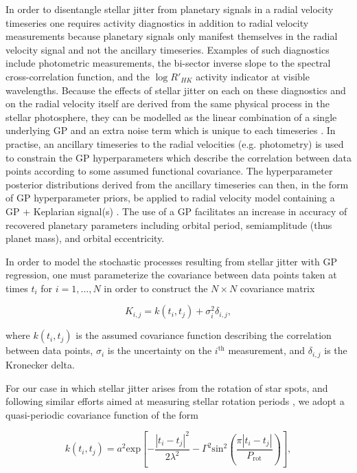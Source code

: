 In order to disentangle stellar jitter from planetary signals in a radial 
velocity timeseries one requires activity diagnostics in addition to radial 
velocity measurements because planetary signals only manifest themselves in 
the radial velocity signal and not the ancillary timeseries. 
Examples of such diagnostics include photometric measurements, 
the bi-sector inverse slope to the spectral cross-correlation function, and 
the $\log{R'_{HK}}$ activity indicator at visible wavelengths. Because the 
effects of stellar jitter on each on these diagnostics and on the radial 
velocity itself 
are derived from the same physical process in the stellar photosphere, they 
can be modelled as the linear combination of a single underlying GP and an extra
noise term which is unique to each timeseries \citep{rajpaul15}. In practise, 
an ancillary timeseries to the radial velocities (e.g. photometry) is used to 
constrain the GP hyperparameters 
which describe the correlation between data points according to some assumed 
functional covariance. The hyperparameter 
posterior distributions derived from the ancillary timeseries can then, in 
the form of GP hyperparameter priors, be 
applied to radial velocity model containing a GP + Keplarian signal(s) 
\citep{hayword14, grunblatt15}. The 
use of a GP facilitates an increase in accuracy of recovered 
planetary parameters including orbital period, semiamplitude (thus planet 
mass), and orbital eccentricity. 

In order to model the stochastic processes resulting from stellar jitter with 
GP regression, one must parameterize the covariance between data points taken 
at times $t_i$ for $i= 1, \dots, N$ in order to construct the $N \times N$ 
covariance matrix 

\begin{equation}
K_{i,j} = k(t_i, t_j) + \sigma_i^2 \delta_{i,j},
\end{equation}

\noindent where $k(t_i,t_j)$ is the assumed covariance function describing 
the correlation between data points, $\sigma_i$ is the uncertainty on the 
$i^{\mathrm{th}}$ measurement, and $\delta_{i,j}$ is the Kronecker delta. 

For our case in which stellar jitter arises from the rotation of star spots, 
and following similar efforts aimed at measuring stellar rotation periods 
\citep[e.g.][]{mancini15, vanderburg15}, we adopt a quasi-periodic covariance 
function of the form 

\begin{equation}
k(t_i, t_j) = a^2 \mathrm{exp} \left[-\frac{|t_i-t_j|^2}{2\lambda^2} 
-\Gamma^2 \mathrm{sin}^2 \left( \frac{\pi|t_i-t_j|}{P_{\mathrm{rot}}} \right) 
\right],
\end{equation}

